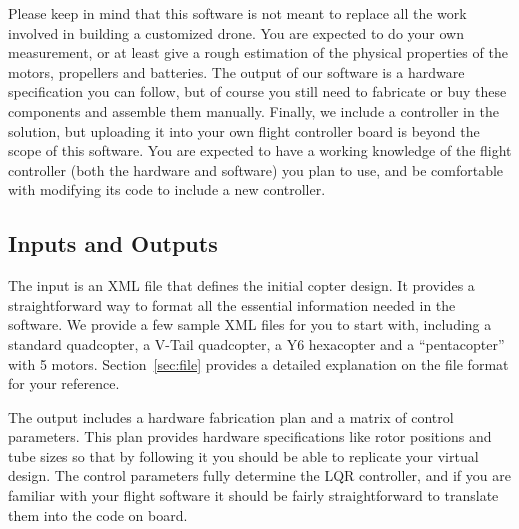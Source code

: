 Please keep in mind that this software is not meant to replace all the work involved in building a customized drone. You are expected to do your own measurement, or at least give a rough estimation of the physical properties of the motors, propellers and batteries. The output of our software is a hardware specification you can follow, but of course you still need to fabricate or buy these components and assemble them manually. Finally, we include a controller in the solution, but uploading it into your own flight controller board is beyond the scope of this software. You are expected to have a working knowledge of the flight controller (both the hardware and software) you plan to use, and be comfortable with modifying its code to include a new controller.

\subsection{Inputs and Outputs}
The input is an XML file that defines the initial copter design. It provides a straightforward way to format all the essential information needed in the software. We provide a few sample XML files for you to start with, including a standard quadcopter, a V-Tail quadcopter, a Y6 hexacopter and a ``pentacopter'' with 5 motors. Section~\ref{sec:file} provides a detailed explanation on the file format for your reference.

The output includes a hardware fabrication plan and a matrix of control parameters. This plan provides hardware specifications like rotor positions and tube sizes so that by following it you should be able to replicate your virtual design. The control parameters fully determine the LQR controller, and if you are familiar with your flight software it should be fairly straightforward to translate them into the code on board.

